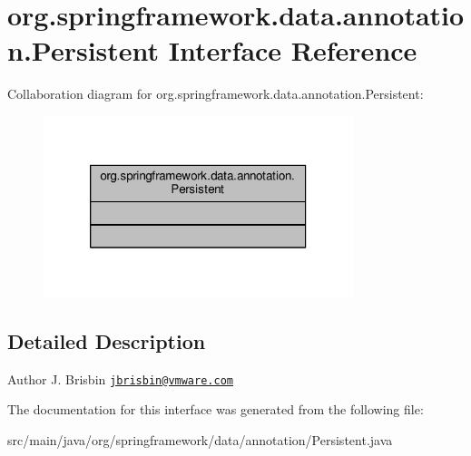 \hypertarget{interfaceorg_1_1springframework_1_1data_1_1annotation_1_1Persistent}{}\section{org.\+springframework.\+data.\+annotation.\+Persistent Interface Reference}
\label{interfaceorg_1_1springframework_1_1data_1_1annotation_1_1Persistent}


Collaboration diagram for org.\+springframework.\+data.\+annotation.\+Persistent\+:
\nopagebreak
\begin{figure}[H]
\begin{center}
\leavevmode
\includegraphics[width=256pt]{interfaceorg_1_1springframework_1_1data_1_1annotation_1_1Persistent__coll__graph}
\end{center}
\end{figure}


\subsection{Detailed Description}
\begin{DoxyAuthor}{Author}
J. Brisbin \href{mailto:jbrisbin@vmware.com}{\tt jbrisbin@vmware.\+com} 
\end{DoxyAuthor}


The documentation for this interface was generated from the following file\+:\begin{DoxyCompactItemize}
\item 
src/main/java/org/springframework/data/annotation/Persistent.\+java\end{DoxyCompactItemize}
